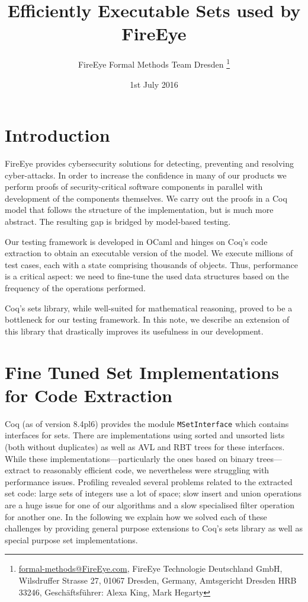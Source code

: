 \documentclass[a4paper,10pt,oneside]{article}
\title{Efficiently Executable Sets used by FireEye}
\author{FireEye Formal Methods Team Dresden%
  \footnote{\url{formal-methods@FireEye.com}, FireEye Technologie Deutschland GmbH, Wilsdruffer Strasse 27, 01067 Dresden, Germany, Amtsgericht Dresden HRB 33246, Geschäftsführer: Alexa King, Mark Hegarty}}
\date{1st July 2016}
\newcommand{\code}[1]{\texttt{#1}}
\begin{document}
\maketitle

\section{Introduction}



FireEye provides cybersecurity solutions for detecting, preventing and
resolving cyber-attacks. In
order to increase the confidence in many of our products we perform proofs of security-critical software
components in parallel with development of the components themselves.
We
carry out the proofs in a Coq~\cite{coq} model that follows the structure of the
implementation, but is much more abstract. The resulting gap is
bridged by model-based testing.

Our testing framework is developed in OCaml and hinges on Coq's code
extraction to obtain an executable version of the model. We execute
millions of test cases, each with a state comprising thousands of
objects. Thus, performance is a critical aspect: we need to fine-tune
the used data structures based on the frequency of the operations
performed.

Coq's sets library, while well-suited for mathematical reasoning,
proved to be a bottleneck for our testing framework.  In this note, we
describe an extension of this library that drastically improves its
usefulness in our development.

\section{Fine Tuned Set Implementations for Code Extraction}

Coq (as of version 8.4pl6) provides the module \code{MSetInterface}
which contains interfaces for sets. There are implementations using
sorted and unsorted lists (both without duplicates) as well as AVL and
RBT trees for these interfaces. While these
implementations---particularly the ones based on binary trees---
extract to reasonably efficient code, we nevertheless were struggling with performance
issues. Profiling revealed several problems related to the extracted
set code: large sets of integers use a lot of space; slow insert and
union operations are a huge issue for one of our algorithms and a slow
specialised filter operation for another one. In the following we
explain how we solved each of these challenges by providing general
purpose extensions to Coq's sets library as well as special purpose
set implementations.
\end{document}

